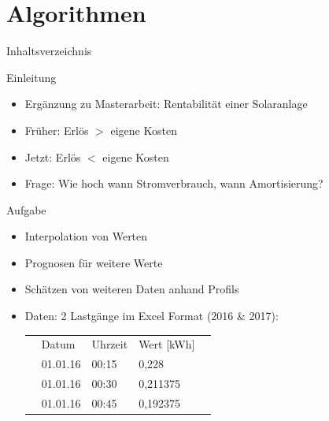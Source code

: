 
\section{Algorithmen}
\begin{frame}{Inhaltsverzeichnis}
\tableofcontents[currentsection]
\end{frame}

\begin{frame}{Einleitung}
	\begin{itemize}
		\item Ergänzung zu Masterarbeit: Rentabilität einer Solaranlage
		\item Früher: Erlös $>$ eigene Kosten
		\item Jetzt: Erlös $<$ eigene Kosten
		\item Frage: Wie hoch wann Stromverbrauch, wann Amortisierung?
	\end{itemize}
\end{frame}

\begin{frame}{Aufgabe}
\begin{itemize}
	\item Interpolation von Werten
	\item Prognosen für weitere Werte
	\item Schätzen von weiteren Daten anhand Profils
	\bigskip
	\item Daten: 2 Lastgänge im Excel Format (2016 & 2017):
	
\begin{table}[]
	\begin{tabular}{lllll}
		& Datum    & Uhrzeit & Wert [kWh] &  \\
		& 01.01.16 & 00:15   & 0,228      &  \\
		& 01.01.16 & 00:30   & 0,211375   &  \\
		& 01.01.16 & 00:45   & 0,192375   & 
	\end{tabular}
\end{table}
	
\end{itemize}
\end{frame}

